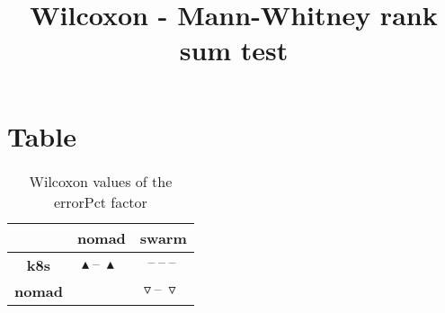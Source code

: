 \documentclass{article}
\title{Wilcoxon - Mann-Whitney rank sum test}
\author{}
\begin{document}
\maketitle
\section{Table}
\begin{table}[!htp]
  \caption{Wilcoxon values of the errorPct factor}
  \label{table:errorPct}
  \centering
  \begin{scriptsize}
  \begin{tabular}{c|cc}
      & \textbf{nomad} & \textbf{swarm} \\\hline
      \textbf{k8s} & $\blacktriangle\ \text{--}\ \blacktriangle\  $ & $ \text{--}\ \text{--}\ \text{--}\ $ \\
      \textbf{nomad} & $ $ & $ \triangledown\ \text{--}\ \triangledown\ $ \\
  \end{tabular}
  \end{scriptsize}
\end{table}
\end{document}

